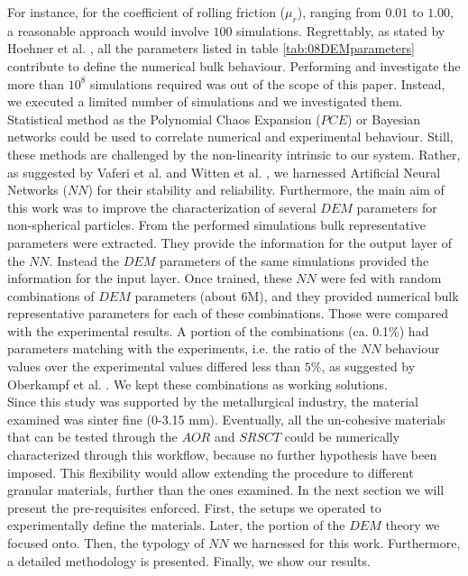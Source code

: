 For instance, for the coefficient of rolling friction ($\mu_r$), ranging from
$0.01$ to $1.00$, a reasonable approach would involve $100$ simulations.
%
Regrettably, as stated by Hoehner et al. \cite{RefWorks:86}, all the parameters listed in table \ref{tab:08DEMparameters}
contribute to define the numerical bulk behaviour. Performing and investigate the 
more than $10^8$ simulations required was out of the scope of this paper.
Instead, we executed a limited number of simulations and we investigated them. 
Statistical method as the Polynomial Chaos Expansion ($PCE$) or Bayesian
networks could be used to correlate numerical and experimental behaviour. 
Still, these methods are challenged by the non-linearity intrinsic to our system. 
Rather, as suggested by Vaferi et al. \cite{RefWorks:150} and Witten et al.
\cite{RefWorks:174}, we harnessed Artificial Neural Networks ($NN$) for their
stability and reliability.
Furthermore, the main aim of this work was to improve the characterization 
of several $DEM$ parameters for non-spherical particles. 
From the performed simulations bulk representative parameters were extracted. 
They provide the information for the output layer of the $NN$. Instead the $DEM$ 
parameters of the same simulations provided the information for the input layer. 
Once trained, these $NN$ were fed with random combinations of $DEM$ parameters
(about 6M), and they provided numerical bulk representative parameters for each
of these combinations.
Those were compared with the experimental results. A portion of the combinations
(ca. 0.1\%) had parameters matching with the experiments, i.e. the ratio of the $NN$ behaviour
values over the experimental values differed less than $5\%$, as suggested by
Oberkampf et al. \cite{RefWorks:160}.
We kept these combinations as working solutions. \\
Since this study was supported by the metallurgical industry, the material examined was  sinter fine (0-3.15 mm).
Eventually, all the un-cohesive materials that can be tested through the $AOR$
and $SRSCT$ could be numerically characterized through this workflow, because no
further hypothesis have been imposed.
This flexibility would allow extending the procedure to different granular materials, further than the ones examined.
In the next section we will present the pre-requisites enforced. 
First, the setups we operated to experimentally define the materials. 
Later, the portion of the $DEM$ theory we focused onto. 
Then, the typology of $NN$ we harnessed for this work. 
Furthermore, a detailed methodology is presented. Finally, we show our results.

